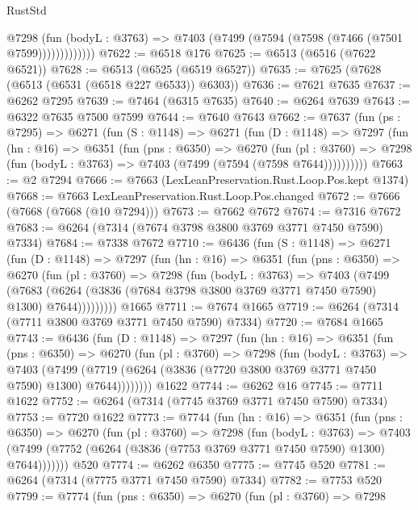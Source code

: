 \begin{lexlean}{RustStd}
\begin{coremodule}
                @7298
                  (fun (bodyL : @3763) =>
                  @7403 (@7499 (@7594 (@7598 (@7466 (@7501 @7599)))))))))))))
@7622 := @6518 @176
@7625 := @6513 (@6516 (@7622 @6521))
@7628 := @6513 (@6525 (@6519 @6527))
@7635 := @7625 (@7628 (@6513 (@6531 (@6518 @227 @6533)) @6303))
@7636 := @7621 @7635
@7637 := @6262 @7295
@7639 := @7464 (@6315 @7635)
@7640 := @6264 @7639
@7643 := @6322 @7635 @7500 @7599
@7644 := @7640 @7643
@7662 := @7637
    (fun (ps : @7295) =>
    @6271
      (fun (S : @1148) =>
      @6271
        (fun (D : @1148) =>
        @7297
          (fun (hn : @16) =>
          @6351
            (fun (pns : @6350) =>
            @6270
              (fun (pl : @3760) =>
              @7298 (fun (bodyL : @3763) => @7403 (@7499 (@7594 (@7598 @7644))))))))))
@7663 := @2 @7294
@7666 := @7663 (LexLeanPreservation.Rust.Loop.Pos.kept @1374)
@7668 := @7663 LexLeanPreservation.Rust.Loop.Pos.changed
@7672 := @7666 (@7668 (@7668 (@10 @7294)))
@7673 := @7662 @7672
@7674 := @7316 @7672
@7683 := @6264 (@7314 (@7674 @3798 @3800 @3769 @3771 @7450 @7590) @7334)
@7684 := @7338 @7672
@7710 := @6436
    (fun (S : @1148) =>
    @6271
      (fun (D : @1148) =>
      @7297
        (fun (hn : @16) =>
        @6351
          (fun (pns : @6350) =>
          @6270
            (fun (pl : @3760) =>
            @7298
              (fun (bodyL : @3763) =>
              @7403
                (@7499
                  (@7683
                    (@6264 (@3836 (@7684 @3798 @3800 @3769 @3771 @7450 @7590) @1300) @7644)))))))))
    @1665
@7711 := @7674 @1665
@7719 := @6264 (@7314 (@7711 @3800 @3769 @3771 @7450 @7590) @7334)
@7720 := @7684 @1665
@7743 := @6436
    (fun (D : @1148) =>
    @7297
      (fun (hn : @16) =>
      @6351
        (fun (pns : @6350) =>
        @6270
          (fun (pl : @3760) =>
          @7298
            (fun (bodyL : @3763) =>
            @7403
              (@7499 (@7719 (@6264 (@3836 (@7720 @3800 @3769 @3771 @7450 @7590) @1300) @7644))))))))
    @1622
@7744 := @6262 @16
@7745 := @7711 @1622
@7752 := @6264 (@7314 (@7745 @3769 @3771 @7450 @7590) @7334)
@7753 := @7720 @1622
@7773 := @7744
    (fun (hn : @16) =>
    @6351
      (fun (pns : @6350) =>
      @6270
        (fun (pl : @3760) =>
        @7298
          (fun (bodyL : @3763) =>
          @7403 (@7499 (@7752 (@6264 (@3836 (@7753 @3769 @3771 @7450 @7590) @1300) @7644)))))))
    @520
@7774 := @6262 @6350
@7775 := @7745 @520
@7781 := @6264 (@7314 (@7775 @3771 @7450 @7590) @7334)
@7782 := @7753 @520
@7799 := @7774
    (fun (pns : @6350) =>
    @6270
      (fun (pl : @3760) =>
      @7298

\end{coremodule}
\end{lexlean}
